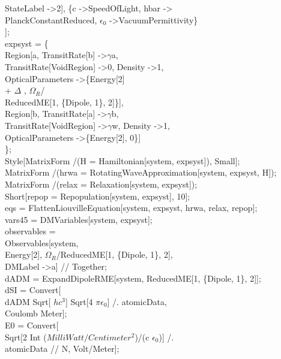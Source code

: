     StateLabel -\textgreater 2], \{c -\textgreater SpeedOfLight, hbar -\textgreater \\
     PlanckConstantReduced, $\epsilon_0$ -\textgreater VacuumPermittivity\}\\
   ];\\
expsyst = \{\\
   Region[a, TransitRate[b] -\textgreater $\gamma$a, \\
    TransitRate[VoidRegion] -\textgreater 0, Density -\textgreater 1, \\
    OpticalParameters -\textgreater \{Energy[2]\\
         + $\Delta$ , $\Omega_R$/\\
       ReducedME[1, \{Dipole, 1\}, 2]\}],\\
   Region[b, TransitRate[a] -\textgreater $\gamma$b, \\
    TransitRate[VoidRegion] -\textgreater $\gamma$w, Density -\textgreater 1, \\
    OpticalParameters -\textgreater \{Energy[2], 0\}]\\
   \};\\
Style[MatrixForm /\@ (H = Hamiltonian[system, expsyst]), Small];\\
MatrixForm /\@ (hrwa = RotatingWaveApproximation[system, expsyst, H]);\\
MatrixForm /\@ (relax = Relaxation[system, expsyst]);\\
Short[repop = Repopulation[system, expsyst], 10];\\
eqs = Flatten\@ LiouvilleEquation[system, expsyst, hrwa, relax, repop];\\
vars45 = DMVariables[system, expsyst];\\
observables = \\
Observables[system, \\
    Energy[2], $\Omega_R$/ReducedME[1, \{Dipole, 1\}, 2], \\
    DMLabel -\textgreater a] // Together;\\
dADM = ExpandDipoleRME[system, ReducedME[1, \{Dipole, 1\}, 2]];\\
dSI = Convert[\\
dADM Sqrt[ $hc^3$] Sqrt[4 $\pi\epsilon_0$] /. atomicData, \\
   Coulomb Meter];\\
E0 = Convert[\\
   Sqrt[2 Int ($Milli Watt/Centimeter^2$)/(c $\epsilon_0$)] /. \\
     atomicData // N, Volt/Meter];\\
